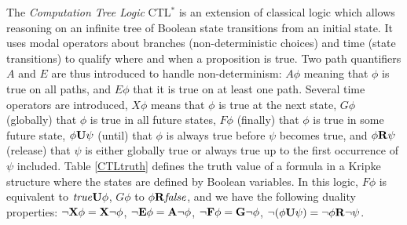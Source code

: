 \documentclass[graybox]{svmult}
\def\true{\mathit{true}}
\def\false{\mathit{false}}
\def\E{{\bf E}}
\def\A{{\bf A}}
\def\F{{\bf F}}
\def\G{{\bf G}}
\def\X{{\bf X}}
\def\U{{\bf U}}
\def\R{{\bf R}}
\begin{document}
The {\em Computation Tree Logic} CTL$^*$ \cite{CGP99mit}
is an extension of
classical logic which allows reasoning on an infinite tree of Boolean state transitions from an initial state.
It uses modal operators about branches (non-deterministic choices) and time (state
transitions) to qualify where and when a proposition is true. Two path quantifiers $A$ and $E$ are thus introduced to handle
non-determinism: $A\phi$ meaning that $\phi$ is true on all paths,
and $E\phi$ that it is true on at least one path.
Several time operators are introduced,
$X\phi$ means that $\phi$ is true
 at the next state,
$G\phi$ (globally) that $\phi$ is true in all future states,
$F\phi$ (finally) that $\phi$ is true in some future state,
$\phi \U\psi$ (until) that $\phi$ is always true before $\psi$ becomes true,
and $\phi\R\psi$ (release) that $\psi$ is either globally true or always true up to the first occurrence of $\psi$ included.
Table \ref{CTLtruth} defines the truth value of a formula in a Kripke
structure where the states are defined by Boolean variables. 
In this logic, $F\phi$ is equivalent to $\true \U \phi$, 
$G\phi$ to $\phi\R \false$, 
and we have the following duality properties:
$\neg\X\phi=\X\neg\phi$,
$\neg\E\phi=\A\neg\phi$, 
$\neg\F\phi=\G\neg\phi$, 
$\neg(\phi \U \psi) = \neg\phi \R \neg\psi$.
\end{document}
